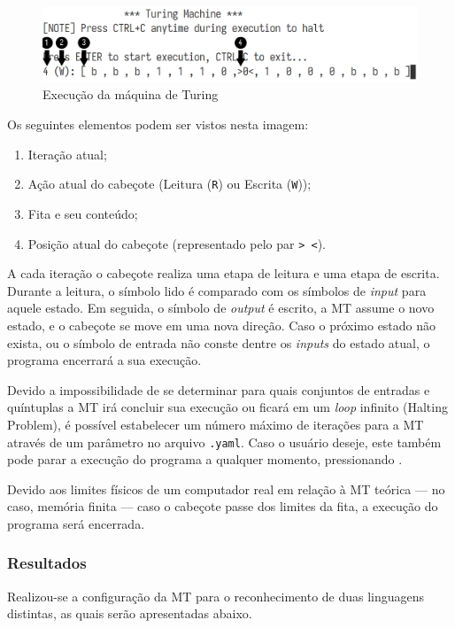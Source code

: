 \documentclass[12pt,fleqn]{article}
\begin{document}
\begin{figure}[H]
    \centering
    \includegraphics[width=0.8\linewidth]{img/tm_run}
    \caption{Execução da máquina de Turing}
\end{figure}

Os seguintes elementos podem ser vistos nesta imagem:

\begin{enumerate}
    \item Iteração atual;
    \item Ação atual do cabeçote (Leitura (\verb|R|) ou Escrita (\verb|W|));
    \item Fita e seu conteúdo;
    \item Posição atual do cabeçote (representado pelo par \verb|> <|).
\end{enumerate}

A cada iteração o cabeçote realiza uma etapa de leitura e uma etapa de escrita.
Durante a leitura, o símbolo lido é comparado com os símbolos de \textit{input}
para aquele estado. Em seguida, o símbolo de \textit{output} é escrito, a MT
assume o novo estado, e o cabeçote se move em uma nova direção. Caso o próximo
estado não exista, ou o símbolo de entrada não conste dentre os \textit{inputs}
do estado atual, o programa encerrará a sua execução.

Devido a impossibilidade de se determinar para quais conjuntos de entradas e
quíntuplas a MT irá concluir sua execução ou ficará em um \textit{loop} infinito
(Halting Problem), é possível estabelecer um número máximo de iterações para a
MT através de um parâmetro no arquivo \verb|.yaml|. Caso o usuário deseje, este
também pode parar a execução do programa a qualquer momento, pressionando
.

Devido aos limites físicos de um computador real em relação à MT teórica --- no
caso, memória finita --- caso o cabeçote passe dos limites da fita, a execução
do programa será encerrada.

\subsubsection{Resultados}
Realizou-se a configuração da MT para o reconhecimento de duas linguagens
distintas, as quais serão apresentadas abaixo.
\end{document}

